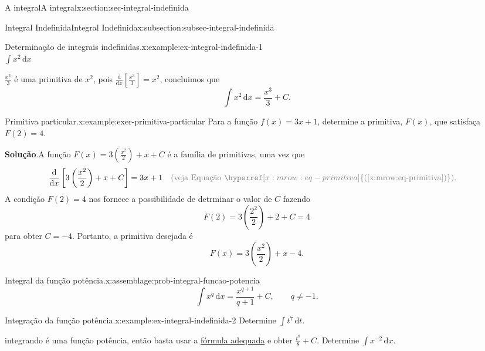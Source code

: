 \documentclass[oneside,10pt,]{article}
\newcommand{\blocktitlefont}{\relax}
\newcommand{\xreffont}{\relax}
\numberwithin{equation}{section}
\newcommand{\dd}{\mathrm{d}}
\newcommand{\integral}[2]{\displaystyle\int {#1}\,\dd {#2}}
\newcommand{\amp}{&}
\begin{document}
\begin{sectionptx}{A integral}{}{A integral}{}{}{x:section:sec-integral-indefinida}
\begin{subsectionptx}{Integral Indefinida}{}{Integral Indefinida}{}{}{x:subsection:subsec-integral-indefinida}
\begin{example}{Determinação de integrais indefinidas.}{x:example:ex-integral-indefinida-1}
\begin{equation*}
\end{equation*}
%
 \(\integral{x^2}{x}\)%
\par\smallskip%
\noindentComo \(\frac{x^3}{3}\) é uma primitiva de \(x^2\), pois \(\frac{\dd}{\dd x}[\frac{x^3}{3}]=x^2\), concluimos que%
\begin{equation*}
\integral{x^2}{x}=\frac{x^3}{3} +C\text{.}
\end{equation*}
%
%
\end{example}
\begin{example}{Primitiva particular.}{x:example:exer-primitiva-particular}%
Para a função \(f(x)=3x+1\), determine a primitiva, \(F(x)\), que satisfaça \(F(2)=4\).%
\par\smallskip%
\noindent\textbf{\blocktitlefont Solução}.\hypertarget{g:solution:idp11}{}\quad{}A função \(F(x)= 3\left(\frac{x^2}{2}\right) + x+ C\) é a família de primitivas, uma vez que%
\begin{align*}
\frac{\dd }{\dd x}\left[3\left(\frac{x^2}{2}\right) + x+ C\right]= 3x+1 \amp \quad \color{gray}{(\text{veja Equação} \,\,  \hyperref[x:mrow:eq-primitiva]{\text{({\xreffont\ref{x:mrow:eq-primitiva}})}})}\text{.}
\end{align*}
A condição \(F(2)=4\) nos fornece a possibilidade de detrminar o valor de \(C\) fazendo%
\begin{equation*}
F(2)=   3\left(\frac{2^2}{2}\right) + 2 + C = 4
\end{equation*}
para obter \(C=-4\). Portanto, a primitiva desejada é%
\begin{equation*}
F(x)= 3\left(\frac{x^2}{2}\right) + x - 4\text{.}
\end{equation*}
%
\end{example}
\begin{assemblage}{Integral da função potência.}{x:assemblage:prob-integral-funcao-potencia}%
%
\begin{equation*}
\integral{x^q}{x} = \frac{x^{q+1}}{q+1} + C, \qquad q\neq - 1.
\end{equation*}
%
\end{assemblage}
\begin{example}{Integração da função potência.}{x:example:ex-integral-indefinida-2}%
Determine \(\integral{t^7}{t}\).%
\par\smallskip%
\noindentO integrando é uma função potência, então basta usar a \hyperref[x:assemblage:prob-integral-funcao-potencia]{fórmula adequada} e obter \(\frac{t^8}{8} + C\).%
 Determine \(\integral{x^{-2}}{x}\).%
\par\smallskip%

\end{example}
\end{subsectionptx}
\end{sectionptx}
\end{document}
